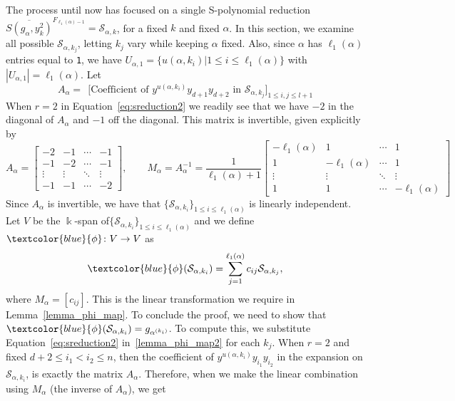 \documentclass[10pt,a4paper]{article}
\def\field{\Bbbk}
\newcommand{\blue}[1]{\textcolor{blue}{#1}}
\begin{document}
The process until now has focused on a single S-polynomial reduction $\overline{S(g_\alpha, y_k^2)}^{F_{\ell_1(\alpha)-1}} =\mathcal{S}_{\alpha, k} $, for a fixed $k$ and fixed $\alpha$. In this section, we examine all possible $\mathcal{S}_{\alpha, k_{j}}$, letting $k_j$ vary while keeping $\alpha$ fixed. Also, since $\alpha$ has $\ell_1(\alpha)$ entries equal to \textnormal{\texttt{1}}, we have $U_{\alpha, 1}=\big\{u(\alpha,k_i)\big| 1\le i\le \ell_1(\alpha)\big\}$ with  $|U_{\alpha,1}| = \ell_1(\alpha)$. Let
   $$A_\alpha = \ \  \Big[ \text{Coefficient of } y^{u(\alpha, k_i)}y_{d+1}y_{d+2} \text{ in } \mathcal{S}_{\alpha,k_j} \Big]_{1 \leq i,j \leq l+1}$$
When $r=2$ in Equation~\eqref{eq:sreduction2} we readily see that we have $-2$ in the diagonal of $A_\alpha$ and $-1$ off the  diagonal. 
This matrix is invertible, given explicitly by
$$
    A_\alpha  =  
    \begin{bmatrix} -2 & -1 & \cdots  & -1 \\-1 & -2 &  \cdots & -1 \\  \vdots & \vdots & \ddots  & \vdots \\ -1 & -1 & \cdots & -2 \end{bmatrix},
    \qquad
    M_\alpha =A_\alpha^{-1}  = \frac{1}{\ell_1(\alpha)+1} 
    \begin{bmatrix} -\ell_1(\alpha) & 1 & \cdots  & 1 \\1 & -\ell_1(\alpha)& \cdots & 1 \\ \vdots & \vdots  & \ddots & \vdots \\ 1 & 1 & \cdots  & -\ell_1(\alpha)  \end{bmatrix}
$$
Since $A_\alpha$ is invertible, we have that $\{\mathcal{S}_{\alpha, k_i}\}_{1 \leq i \leq \ell_1(\alpha)}$ is linearly independent. Let $V$ be the $\field$-span of\break $\{\mathcal{S}_{\alpha, k_i}\}_{1 \leq i \leq \ell_1(\alpha)}$ and we define $\blue{\phi}\colon V \to  V$ as 
\begin{equation} \label{lemma_phi_map2}
    \blue{\phi} (\mathcal{S}_{\alpha, k_i}) = \sum_{j=1}^{\ell_1(\alpha)} c_{ij} \mathcal{S}_{\alpha, {k_{j}}},
\end{equation}
where $M_\alpha=[c_{ij}]$. This is the linear transformation we require in  Lemma~\ref{lemma_phi_map}. To conclude the proof, we need to show that  $\blue{\phi}(\mathcal{S}_{\alpha, k_i})  = g_{\alpha^{(k_i)}}$. To compute this, we substitute Equation~\eqref{eq:sreduction2} in~\eqref{lemma_phi_map2} for each $k_j$. When $r=2$ and fixed $d+2 \leq i_1 < i_2 \leq n$, then the coefficient of 
$y^{u(\alpha, k_i)} y_{i_1} y_{i_2}$ in the expansion on $\mathcal{S}_{\alpha, k_i}$, is exactly the matrix $A_\alpha$. Therefore, when we make the linear combination using $M_\alpha$ (the  inverse of $A_\alpha$), we get
\end{document}
